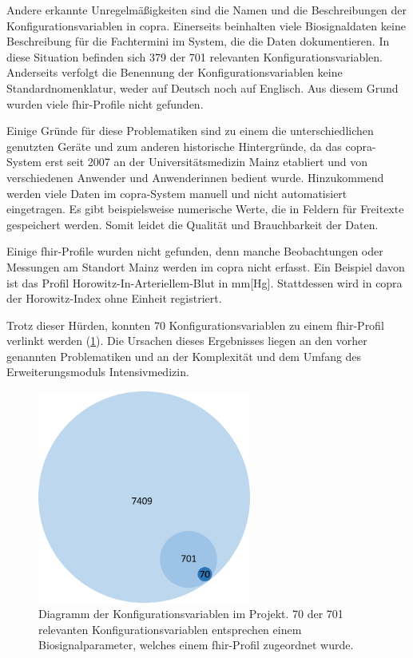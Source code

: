 Andere erkannte Unregelmäßigkeiten sind die Namen und die Beschreibungen der Konfigurationsvariablen in \ac{copra}. Einerseits beinhalten viele Biosignaldaten keine Beschreibung für die Fachtermini im System, die die Daten dokumentieren. In diese Situation befinden sich 379 der 701 relevanten Konfigurationsvariablen. Anderseits verfolgt die Benennung der Konfigurationsvariablen keine Standardnomenklatur, weder auf Deutsch noch auf Englisch. Aus diesem Grund wurden viele \ac{fhir}-Profile nicht gefunden.

Einige Gründe für diese Problematiken sind zu einem die unterschiedlichen genutzten Geräte und zum anderen historische Hintergründe, da das \ac{copra}-System erst seit 2007 an der Universitätsmedizin Mainz etabliert und von verschiedenen Anwender und Anwenderinnen bedient wurde. Hinzukommend werden viele Daten im \ac{copra}-System manuell und nicht automatisiert eingetragen. Es gibt beispielsweise numerische Werte, die in Feldern für Freitexte gespeichert werden. Somit leidet die Qualität und Brauchbarkeit der Daten.

Einige \ac{fhir}-Profile wurden nicht gefunden, denn manche Beobachtungen oder Messungen am Standort Mainz werden im \ac{copra} nicht erfasst. Ein Beispiel davon ist das Profil \glqq Horowitz-In-Arteriellem-Blut\grqq{} in mm[Hg]. Stattdessen wird in \ac{copra} der Horowitz-Index ohne Einheit registriert.

Trotz dieser Hürden, konnten 70 Konfigurationsvariablen zu einem \ac{fhir}-Profil verlinkt werden (\ref{fig:conf_var}). Die Ursachen dieses Ergebnisses liegen an den vorher genannten Problematiken und an der Komplexität und dem Umfang des Erweiterungsmoduls \glqq Intensivmedizin\grqq{}.

\begin{figure}[ht]
	\centering
	\includegraphics[height=7cm]{figures/config_var}
	\caption[Diagramm der Konfigurationsvariablen im Projekt]{Diagramm der Konfigurationsvariablen im Projekt. 70 der 701 relevanten Konfigurationsvariablen entsprechen einem Biosignalparameter, welches einem \ac{fhir}-Profil zugeordnet wurde. 
	}
	\label{fig:conf_var}
\end{figure}